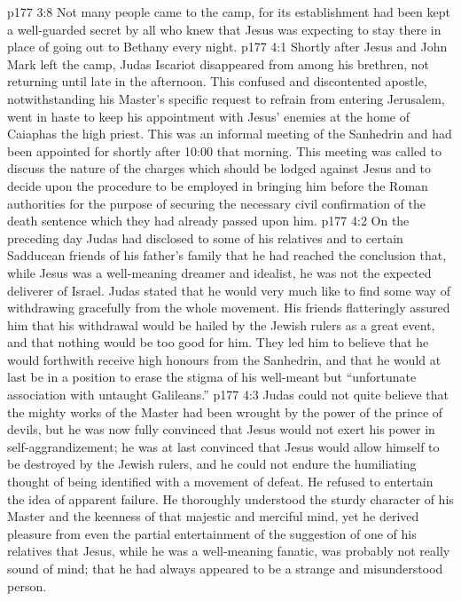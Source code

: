 \vs p177 3:8 \pc Not many people came to the camp, for its establishment had been kept a well\hyp{}guarded secret by all who knew that Jesus was expecting to stay there in place of going out to Bethany every night.
\vs p177 4:1 Shortly after Jesus and John Mark left the camp, Judas Iscariot disappeared from among his brethren, not returning until late in the afternoon. This confused and discontented apostle, notwithstanding his Master’s specific request to refrain from entering Jerusalem, went in haste to keep his appointment with Jesus’ enemies at the home of Caiaphas the high priest. This was an informal meeting of the Sanhedrin and had been appointed for shortly after 10:00 that morning. This meeting was called to discuss the nature of the charges which should be lodged against Jesus and to decide upon the procedure to be employed in bringing him before the Roman authorities for the purpose of securing the necessary civil confirmation of the death sentence which they had already passed upon him.
\vs p177 4:2 On the preceding day Judas had disclosed to some of his relatives and to certain Sadducean friends of his father’s family that he had reached the conclusion that, while Jesus was a well\hyp{}meaning dreamer and idealist, he was not the expected deliverer of Israel. Judas stated that he would very much like to find some way of withdrawing gracefully from the whole movement. His friends flatteringly assured him that his withdrawal would be hailed by the Jewish rulers as a great event, and that nothing would be too good for him. They led him to believe that he would forthwith receive high honours from the Sanhedrin, and that he would at last be in a position to erase the stigma of his well\hyp{}meant but “unfortunate association with untaught Galileans.”
\vs p177 4:3 Judas could not quite believe that the mighty works of the Master had been wrought by the power of the prince of devils, but he was now fully convinced that Jesus would not exert his power in self\hyp{}aggrandizement; he was at last convinced that Jesus would allow himself to be destroyed by the Jewish rulers, and he could not endure the humiliating thought of being identified with a movement of defeat. He refused to entertain the idea of apparent failure. He thoroughly understood the sturdy character of his Master and the keenness of that majestic and merciful mind, yet he derived pleasure from even the partial entertainment of the suggestion of one of his relatives that Jesus, while he was a well\hyp{}meaning fanatic, was probably not really sound of mind; that he had always appeared to be a strange and misunderstood person.
